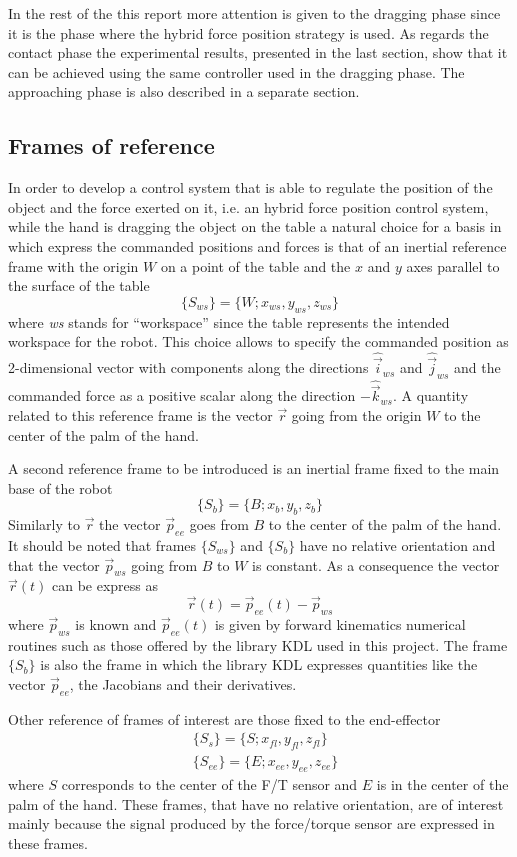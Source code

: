 In the rest of the this report more attention is given to the dragging phase since it is the phase
where the hybrid force position strategy is used. As regards the contact phase the experimental results,
presented in the last section, show that it can be achieved using the same controller used in the dragging
phase. The approaching phase is also described in a separate section.

\subsection{Frames of reference}\label{sec:frames}
In order to develop a control system that is able to regulate the position of the object
and the force exerted on it, i.e. an hybrid force position control system, while the hand
is dragging the object on the table
a natural choice for a basis in which express the commanded positions and forces is that of
an inertial reference frame with the origin $W$ on a point of the table and the $x$ and $y$ axes parallel to the surface
of the table
\[
\{S_{ws}\} = \{W; x_{ws}, y_{ws}, z_{ws} \}
\]
where \emph{ws} stands for ``workspace'' since the table represents the intended workspace
for the robot. This choice allows to specify the commanded position as 2-dimensional vector
with components along the directions $\hat{\vec{i}}_{ws}$ and $\hat{\vec{j}}_{ws}$ and the
commanded force as a positive scalar along the direction $-\hat{\vec{k}}_{ws}$.
A quantity related to this reference frame is the vector $\vec{r}$ going from the origin $W$
to the center of the palm of the hand.
\par
A second reference frame to be introduced is an inertial frame fixed to the main base of the robot
\[
\{S_b\} = \{B; x_b, y_b, z_b \}
\]
Similarly to $\vec{r}$ the vector $\vec{p}_{ee}$ goes from $B$ to the center of the palm of the hand.
It should be noted that frames $\{S_{ws}\}$ and $\{S_b\}$ have no relative orientation and that
the vector $\vec{p}_{ws}$ going from $B$ to $W$ is constant. As a consequence the vector $\vec{r}(t)$
can be express as
\[
\vec{r}(t) = \vec{p}_{ee}(t) - \vec{p}_{ws}
\]
where $\vec{p}_{ws}$ is known and $\vec{p}_{ee}(t)$ is given by forward kinematics
numerical routines such as those offered by the library KDL used in this project.
The frame $\{S_b\}$ is also the frame in which the library KDL expresses quantities
like the vector $\vec{p}_{ee}$, the Jacobians and their derivatives.
\par
Other reference of frames of interest are those fixed to the end-effector
\[
\begin{split}
  &\{S_{s}\} = \{S; x_{fl}, y_{fl}, z_{fl} \}\\
  &\{S_{ee}\} = \{E; x_{ee}, y_{ee}, z_{ee} \}
\end{split}
\]
where $S$ corresponds to the center of the F/T sensor  and $E$ is in the center
of the palm of the hand. These frames, that have no relative orientation,  are of interest
mainly because the signal produced by the force/torque sensor are expressed in these frames.

